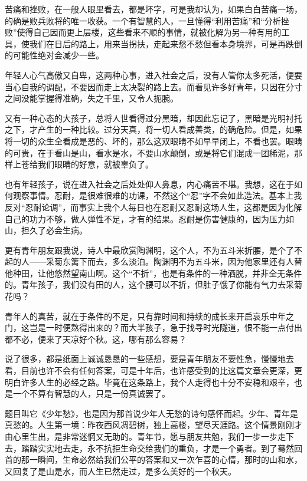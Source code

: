 \par 苦痛和挫败，在一般人眼里看去，都是坏字，可是我却认为，如果白白苦痛一场，的确是败兵败将的唯一收获。一个有智慧的人，一旦懂得“利用苦痛”和“分析挫败”使得自己因而更上层楼，这些看来不顺的事情，就被化解为另一种有用的工具，使我们在日后的路上，用来当拐扶，走起来愁不愁但看本身境界，可是再跌倒的可能性绝对会减少一些。
\par 年轻人心气高傲又自卑，这两种心事，进入社会之后，没有人管你太多死活，便要当心自我的调配，不要因而走上太决裂的路上去。而看见许多好青年，只因在分寸之间没能掌握得准确，失之千里，又令人扼腕。
\par 又有一种心态的大孩子，总将人世看得过分黑暗，却因此忘记了，黑暗是光明衬托之下，才产生的一种比较。过分天真，将一切人看成善类，的确危险。但是，如果将一切的众生全看成是恶的、坏的，那么这双眼睛不如早早闭上，不看也罢。眼睛的可贵，在于看山是山，看水是水，不要山水颠倒，或是将它们混成一团稀泥，那样上苍给我们眼睛的好意，就被辜负了。
\par 也有年轻孩子，说在进入社会之后处处仰人鼻息，内心痛苦不堪。我想，这在于如何观察事情。忍耐，是很难很难的功课，不然这个“忍”字不会如此造法。基本上我反对“忍耐论调”，而事实上我个人每日也在忍耐又忍耐这场人生，这都是因为化解自己的功力不够，做人弹性不足，才有的结果。忍耐是伤害健康的，因为压力如山，担久了必会生病。
\par 更有青年朋友跟我说，诗人中最欣赏陶渊明，这个人，不为五斗米折腰，是个了不起的人——采菊东篱下而去，多么淡泊。陶渊明不为五斗米，因为他家里还有人替他种田，让他悠然望南山啊。这个“不折”，也是有条件的一种洒脱，并非全无条件的。青年孩子，我们没有田的人，这个腰可以不折，但肚子饿了你能有气力去采菊花吗？
\par 青年人的真苦，就在于条件的不足，只有靠时间和持续的成长来开启哀乐中年之门，这岂是一时便熬得出来的？而大半孩子，急于找寻时光隧道，恨不能一点付出都不必，便来了天凉好个秋。这，哪有那么容易？
\par 说了很多，都是纸面上诚诚恳恳的一些感想，要是青年朋友不要性急，慢慢地去看，目前也许不会有任何答案，可是十年后，也许感受到的比这篇文章会更深，更明白许多人生的必经之路。毕竟在这条路上，我个人走得也十分不安稳和艰辛，也是一个不算有智慧的人，只是一份真诚罢了。
\par 题目叫它《少年愁》，也是因为那首说少年人无愁的诗句感怀而起。少年、青年是真愁的。人生第一境：昨夜西风凋碧树，独上高楼，望尽天涯路。这个情景刚刚才由心里生出，是非常迷惘又无助的。青年节，愿与朋友共勉，我们一步一步走下去，踏踏实实地去走，永不抗拒生命交给我们的重负，才是一个勇者。到了蓦然回首的那一瞬间，生命必然给我们公平的答案和又一次乍喜的心情，那时的山和水，又回复了是山是水，而人生已然走过，是多么美好的一个秋天。
\par {}












